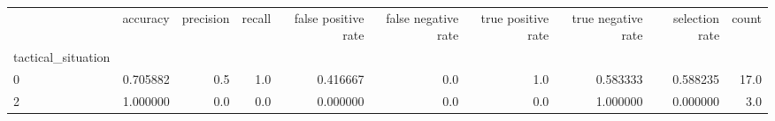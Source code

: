 \begin{tabular}{lrrrrrrrrr}
\toprule
{} &  accuracy &  precision &  recall &  false positive rate &  false negative rate &  true positive rate &  true negative rate &  selection rate &  count \\
tactical\_situation &           &            &         &                      &                      &                     &                     &                 &        \\
\midrule
0                  &  0.705882 &        0.5 &     1.0 &             0.416667 &                  0.0 &                 1.0 &            0.583333 &        0.588235 &   17.0 \\
2                  &  1.000000 &        0.0 &     0.0 &             0.000000 &                  0.0 &                 0.0 &            1.000000 &        0.000000 &    3.0 \\
\bottomrule
\end{tabular}
